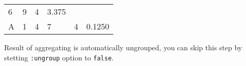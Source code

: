\documentclass[]{article}
\newenvironment{Shaded}{\begin{snugshade}}{\end{snugshade}}
\newcommand{\KeywordTok}[1]{\textcolor[rgb]{0.13,0.29,0.53}{\textbf{#1}}}
\newcommand{\DecValTok}[1]{\textcolor[rgb]{0.00,0.00,0.81}{#1}}
\newcommand{\StringTok}[1]{\textcolor[rgb]{0.31,0.60,0.02}{#1}}
\newcommand{\VariableTok}[1]{\textcolor[rgb]{0.00,0.00,0.00}{#1}}
\newcommand{\AttributeTok}[1]{\textcolor[rgb]{0.77,0.63,0.00}{#1}}
\newcommand{\NormalTok}[1]{#1}
\begin{document}
\begin{longtable}[]{@{}llllll@{}}
\begin{minipage}[t]{0.14\columnwidth}
6\strut
\end{minipage} & \begin{minipage}[t]{0.14\columnwidth}\raggedright\strut
9\strut
\end{minipage} & \begin{minipage}[t]{0.18\columnwidth}\raggedright\strut
4\strut
\end{minipage} & \begin{minipage}[t]{0.19\columnwidth}\raggedright\strut
3.375\strut
\end{minipage}\tabularnewline
\begin{minipage}[t]{0.05\columnwidth}\raggedright\strut
A\strut
\end{minipage} & \begin{minipage}[t]{0.14\columnwidth}\raggedright\strut
1\strut
\end{minipage} & \begin{minipage}[t]{0.14\columnwidth}\raggedright\strut
4\strut
\end{minipage} & \begin{minipage}[t]{0.14\columnwidth}\raggedright\strut
7\strut
\end{minipage} & \begin{minipage}[t]{0.18\columnwidth}\raggedright\strut
4\strut
\end{minipage} & \begin{minipage}[t]{0.19\columnwidth}\raggedright\strut
0.1250\strut
\end{minipage}\tabularnewline
\bottomrule
\end{longtable}

Result of aggregating is automatically ungrouped, you can skip this step
by stetting \texttt{:ungroup} option to \texttt{false}.

\begin{Shaded}
\end{Shaded}
\end{document}
